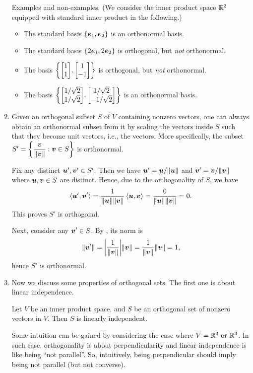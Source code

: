 \begin{enumerate}
Examples and non-examples: (We consider the inner product space \(\mathbb{R}^2\)
equipped with standard inner product in the following.)
\begin{itemize}
\item The standard basis \(\{\vb*{e}_1,\vb*{e}_2\}\) is an orthonormal basis.
\item The standard basis \(\{2\vb*{e}_1,2\vb*{e}_2\}\) is orthogonal, but
\emph{not} orthonormal.
\item The basis \(\qty{\mqty[1\\ 1],\mqty[1\\ -1]}\) is orthogonal, but
\emph{not} orthonormal.
\item The basis \(\qty{\mqty[1/\sqrt{2}\\ 1/\sqrt{2}],\mqty[1/\sqrt{2}\\
-1/\sqrt{2}]}\) is an orthonormal basis.
\end{itemize}

\item Given an orthogonal subset \(S\) of \(V\) containing nonzero vectors, one
can always obtain an orthonormal subset from it by scaling the vectors inside
\(S\) such that they become unit vectors, i.e.,  the vectors.
More specifically, the subset \(S'=\displaystyle
\qty{\frac{\vb*{v}}{\norm{\vb*{v}}}:\vb*{v}\in S}\) is orthonormal.

\begin{pf}
Fix any distinct \(\vb*{u}',\vb*{v}'\in S'\). Then we have
\(\vb*{u}'=\vb*{u}/\norm{\vb*{u}}\) and
\(\vb*{v}'=\vb*{v}/\norm{\vb*{v}}\) where \(\vb*{u},\vb*{v}\in S\) are
distinct. Hence, due to the orthogonality of \(S\), we have
\[
\left\langle \vb*{u}',\vb*{v}'\right\rangle
=\frac{1}{\norm{\vb*{u}}\norm{\vb*{v}}}\left\langle \vb*{u},\vb*{v}\right\rangle
=\frac{0}{\norm{\vb*{u}}\norm{\vb*{v}}}
=0.
\]
This proves \(S'\) is orthogonal.

Next, consider any \(\vb*{v}'\in S\). By , its norm is
\[
\norm{\vb*{v}'}
=\qty|\frac{1}{\norm{\vb*{v}}}|\norm{\vb*{v}}
=\frac{1}{\norm{\vb*{v}}}\norm{\vb*{v}}
=1,
\]
hence \(S'\) is orthonormal.
\end{pf}

\item Now we discuss some properties of orthogonal sets. The first one is about
linear independence.

\begin{theorem}
\label{thm:orthog-imp-li}
Let \(V\) be an inner product space, and \(S\) be an orthogonal set of nonzero
vectors in \(V\). Then \(S\) is linearly independent.
\end{theorem}
\begin{intuition}
Some intuition can be gained by considering the case where \(V=\mathbb{R}^2\text{ or
}\mathbb{R}^3\). In such case, orthogonality is about perpendicularity and linear
independence is like being ``not parallel''. So, intuitively, being
perpendicular should imply being not parallel (but not converse).
\end{intuition}


\end{enumerate}
